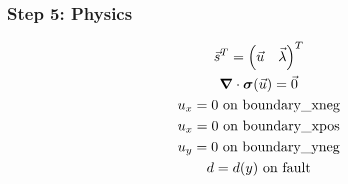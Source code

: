 \documentclass[aspectratio=169]{beamer}
\begin{document}
\begin{frame}
  \frametitle{Step 5: Physics}
  \summary{}

  \begin{minipage}{0.3\textwidth}
    {\scriptsize
    \begin{gather*}
    \vec{s}^T = \left( \vec{u} \quad \vec{\lambda} \right)^T \\
    \bm{\nabla} \cdot \bm{\sigma}(\vec{u}) = \vec{0} \\
    u_x = 0 \text{ on boundary\_xneg} \\
    u_x = 0 \text{ on boundary\_xpos} \\
    u_y = 0 \text{ on boundary\_yneg} \\
    d = d(y) \text{ on fault}
    \end{gather*}}
  \end{minipage}
  \hfill
  \begin{minipage}{0.67\textwidth}
  \end{minipage}
      
\end{frame}
\end{document}
